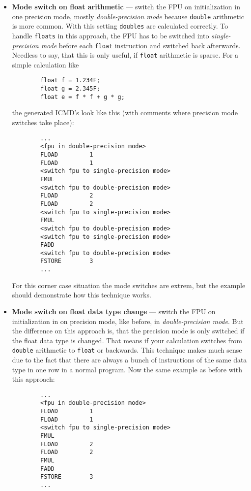 \begin{itemize}
 \item \textbf{Mode switch on float arithmetic} --- switch the FPU on
 initialization in one precision mode, mostly \textit{double-precision
 mode} because \texttt{double} arithmetic is more common. With this
 setting \texttt{doubles} are calculated correctly. To handle
 \texttt{floats} in this approach, the FPU has to be switched into
 \textit{single-precision mode} before each \texttt{float} instruction
 and switched back afterwards. Needless to say, that this is only
 useful, if \texttt{float} arithmetic is sparse. For a simple
 calculation like

 \begin{verbatim}
        float f = 1.234F;
        float g = 2.345F;
        float e = f * f + g * g;
 \end{verbatim}        

 the generated ICMD's look like this (with comments where precision
 mode switches take place):

 \begin{verbatim}
        ...
        <fpu in double-precision mode>
        FLOAD         1
        FLOAD         1
        <switch fpu to single-precision mode>
        FMUL         
        <switch fpu to double-precision mode>
        FLOAD         2
        FLOAD         2
        <switch fpu to single-precision mode>
        FMUL         
        <switch fpu to double-precision mode>
        <switch fpu to single-precision mode>
        FADD         
        <switch fpu to double-precision mode>
        FSTORE        3
        ...
 \end{verbatim}

 For this corner case situation the mode switches are extrem, but the
 example should demonstrate how this technique works.

 \item \textbf{Mode switch on float data type change} --- switch the
 FPU on initialization in on precision mode, like before, in
 \textit{double-precision mode}. But the difference on this approach
 is, that the precision mode is only switched if the float data type
 is changed. That means if your calculation switches from
 \texttt{double} arithmetic to \texttt{float} or backwards. This
 technique makes much sense due to the fact that there are always a
 bunch of instructions of the same data type in one row in a normal
 program. Now the same example as before with this approach:

 \begin{verbatim}
        ...
        <fpu in double-precision mode>
        FLOAD         1
        FLOAD         1
        <switch fpu to single-precision mode>
        FMUL         
        FLOAD         2
        FLOAD         2
        FMUL         
        FADD         
        FSTORE        3
        ...
 \end{verbatim}


\end{itemize}
